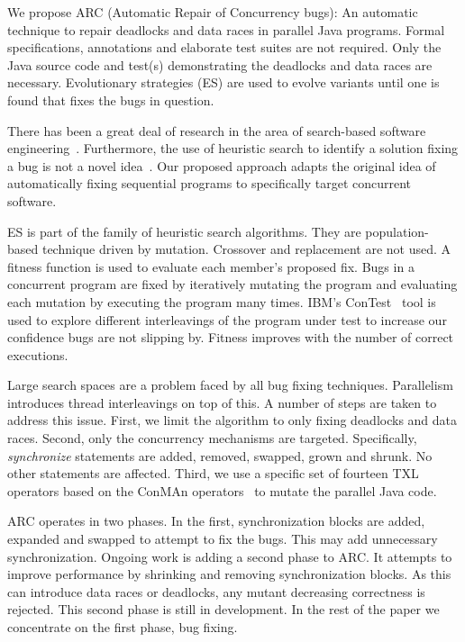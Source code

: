 \documentclass{llncs}
\begin{document}
We propose ARC (Automatic Repair of Concurrency bugs): An automatic technique
to repair deadlocks and data races in parallel Java programs. Formal
specifications, annotations and elaborate test suites are not required. Only
the Java source code and test(s) demonstrating the deadlocks and data races are
necessary. Evolutionary strategies (ES) are used to evolve variants until one
is found that fixes the bugs in question.

There has been a great deal of research in the area of search-based software
engineering~\cite{Har+10}. Furthermore, the use of heuristic search to identify
a solution fixing a bug is not a novel idea~\cite{FNWG09, AY08, Arc08, WT10,
WNLF09, WFGN10}. Our proposed approach adapts the original idea of
automatically fixing sequential programs to specifically target concurrent
software.

ES is part of the family of heuristic search algorithms. They are population-
based technique driven by mutation. Crossover and replacement are not used.
A fitness function is used to evaluate each member's proposed fix. Bugs in a
concurrent program are fixed by iteratively mutating the program and evaluating
each mutation by executing the program many times. IBM's ConTest~\cite{EFN+02}
tool is used to explore different interleavings of the program under test to
increase our confidence bugs are not slipping by. Fitness improves with the
number of correct executions.

Large search spaces are a problem faced by all bug fixing techniques.
Parallelism introduces thread interleavings on top of this. A number of steps
are taken to address this issue. First, we limit the algorithm to only fixing
deadlocks and data races. Second, only the concurrency mechanisms are targeted.
Specifically, \textit{synchronize} statements are added, removed, swapped,
grown and shrunk. No other statements are affected. Third, we use a specific
set of fourteen TXL~\cite{CHP91} operators based on the ConMAn
operators~\cite{BCD06} to mutate the parallel Java code.

ARC operates in two phases. In the first, synchronization blocks are added,
expanded and swapped to attempt to fix the bugs. This may add unnecessary
synchronization. Ongoing work is adding a second phase to ARC.  It
attempts to improve performance by shrinking and removing synchronization
blocks. As this can introduce data races or deadlocks, any mutant decreasing
correctness is rejected. This second phase is still in development.  In the rest of
the paper we concentrate on the first phase, bug fixing.
\end{document}

